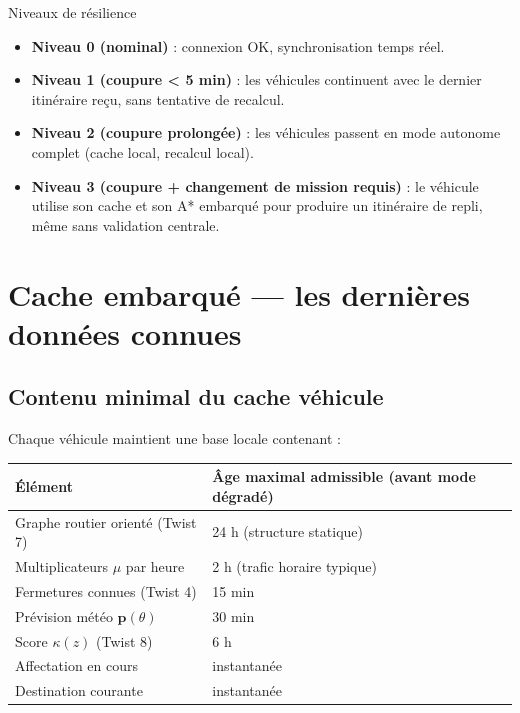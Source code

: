 \documentclass[12pt,a4paper]{article}
\theoremstyle{definition}
\theoremstyle{remark}
\begin{document}
\begin{defbox}{Niveaux de résilience}
\begin{itemize}
  \item \textbf{Niveau 0 (nominal)} : connexion OK, synchronisation temps réel.
  \item \textbf{Niveau 1 (coupure < 5 min)} : les véhicules continuent
        avec le dernier itinéraire reçu, sans tentative de recalcul.
  \item \textbf{Niveau 2 (coupure prolongée)} : les véhicules passent
        en mode autonome complet (cache local, recalcul local).
  \item \textbf{Niveau 3 (coupure + changement de mission requis)} :
        le véhicule utilise son cache et son A* embarqué pour produire
        un itinéraire de repli, même sans validation centrale.
\end{itemize}
\end{defbox}

\newpage

\section{Cache embarqué — les dernières données connues}

\subsection{Contenu minimal du cache véhicule}

Chaque véhicule maintient une base locale contenant :

\begin{center}
\begin{tabular}{ll}
  \toprule
  \textbf{Élément} & \textbf{Âge maximal admissible (avant mode dégradé)} \\
  \midrule
  Graphe routier orienté (Twist 7) & 24 h (structure statique) \\
  Multiplicateurs $\mu$ par heure & 2 h (trafic horaire typique) \\
  Fermetures connues (Twist 4) & 15 min \\
  Prévision météo $\mathbf{p}(\theta)$ & 30 min \\
  Score $\kappa(z)$ (Twist 8) & 6 h \\
  Affectation en cours & instantanée \\
  Destination courante & instantanée \\
  \bottomrule
\end{tabular}
\end{center}
\end{document}

